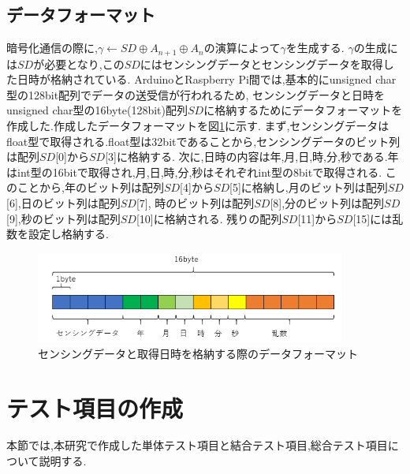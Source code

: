 
\subsection{データフォーマット}
暗号化通信の際に,$\gamma \leftarrow SD \oplus  A_{n+1} \oplus A_n$の演算によって$\gamma$を生成する.
$\gamma$の生成には$SD$が必要となり,この$SD$にはセンシングデータとセンシングデータを取得した日時が格納されている.
ArduinoとRaspberry Pi間では,基本的にunsigned char型の128bit配列でデータの送受信が行われるため,
センシングデータと日時をunsigned char型の16byte(128bit)配列$SD$に格納するためにデータフォーマットを作成した.作成したデータフォーマットを図\ref{fig:format}に示す.
まず,センシングデータはfloat型で取得される.float型は32bitであることから,センシングデータのビット列は配列$SD$[0]から$SD$[3]に格納する.
次に,日時の内容は年,月,日,時,分,秒である.年はint型の16bitで取得され,月,日,時,分,秒はそれぞれint型の8bitで取得される.
このことから,年のビット列は配列$SD$[4]から$SD$[5]に格納し,月のビット列は配列$SD$[6],日のビット列は配列$SD$[7],
時のビット列は配列$SD$[8],分のビット列は配列$SD$[9],秒のビット列は配列$SD$[10]に格納される.
残りの配列$SD$[11]から$SD$[15]には乱数を設定し格納する.

\begin{figure}[H]
\begin{center}
	\includegraphics[height=30mm]{format.png}
	\caption{センシングデータと取得日時を格納する際のデータフォーマット}
	\label{fig:format}
\end{center}
\end{figure}

\section{テスト項目の作成}
本節では,本研究で作成した単体テスト項目と結合テスト項目,総合テスト項目について説明する.
